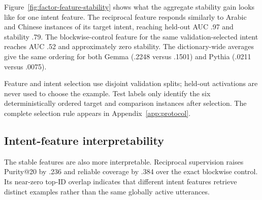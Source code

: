 Figure~\ref{fig:factor-feature-stability} shows what the aggregate stability gain looks like for one intent feature. The reciprocal feature responds similarly to Arabic and Chinese instances of its target intent, reaching held-out AUC .97 and stability .79. The blockwise-control feature for the same validation-selected intent reaches AUC .52 and approximately zero stability. The dictionary-wide averages give the same ordering for both Gemma (.2248 versus .1501) and Pythia (.0211 versus .0075).

Feature and intent selection use disjoint validation splits; held-out activations are never used to choose the example. Test labels only identify the six deterministically ordered target and comparison instances after selection. The complete selection rule appears in Appendix~\ref{app:protocol}.

\subsection{Intent-feature interpretability}

\begin{table}[t]
\centering
\caption{Validation-selected intent features on held-out MASSIVE Arabic and Chinese. Purity and reliable coverage use 46 intents with at least 20 test semantic IDs; stability covers all 58 intents.}
\label{tab:factor-feature-interpretability}
\end{table}

The stable features are also more interpretable. Reciprocal supervision raises Purity@20 by .236 and reliable coverage by .384 over the exact blockwise control. Its near-zero top-ID overlap indicates that different intent features retrieve distinct examples rather than the same globally active utterances.

